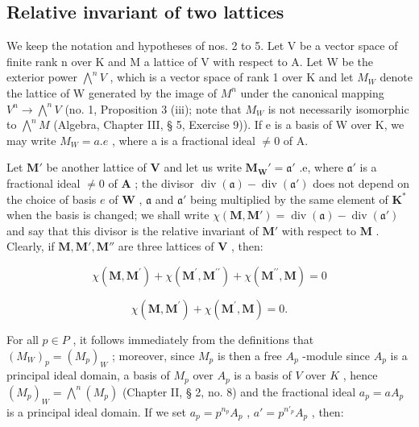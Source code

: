 \subsection{Relative invariant of two lattices}

We keep the notation and hypotheses of nos. 2 to 5. Let V be a vector space of finite rank n over K and M a lattice of V with respect to A. Let W be the exterior power \(\bigwedge^{n}V\) , which is a vector space of rank 1 over K and let \(M_{W}\) denote the lattice of W generated by the image of \(M^{n}\) under the canonical mapping \(V^{n}\to\bigwedge^{n}V\) (no. 1, Proposition 3 (iii); note that \(M_{W}\) is not necessarily isomorphic to \(\bigwedge^{n}M\) (Algebra, Chapter III, § 5, Exercise 9)). If e is a basis of W over K, we may write \(M_{W}=a.e\) , where a is a fractional ideal \(\neq0\) of A.

Let \(\mathbf{M}'\) be another lattice of \(\mathbf{V}\) and let us write \(\mathbf{M}_{\mathbf{W}}' = \mathfrak{a}'\) .e, where \(\mathfrak{a}'\) is a fractional ideal \(\neq 0\) of \(\mathbf{A}\) ; the divisor \(\operatorname{div}(\mathfrak{a}) - \operatorname{div}(\mathfrak{a}')\) does not depend on the choice of basis \(e\) of \(\mathbf{W}\) , \(\mathfrak{a}\) and \(\mathfrak{a}'\) being multiplied by the same element of \(\mathbf{K}^*\) when the basis is changed; we shall write \(\chi(\mathbf{M}, \mathbf{M}') = \operatorname{div}(\mathfrak{a}) - \operatorname{div}(\mathfrak{a}')\) and say that this divisor is the relative invariant of \(\mathbf{M}'\) with respect to \(\mathbf{M}\) . Clearly, if \(\mathbf{M}, \mathbf{M}', \mathbf{M}''\) are three lattices of \(\mathbf{V}\) , then:

\[
\chi (\mathbf {M}, \mathbf {M} ^ {\prime}) + \chi (\mathbf {M} ^ {\prime}, \mathbf {M} ^ {\prime \prime}) + \chi (\mathbf {M} ^ {\prime \prime}, \mathbf {M}) = 0\tag{3}
\]

\[
\chi (\mathbf {M}, \mathbf {M} ^ {\prime}) + \chi (\mathbf {M} ^ {\prime}, \mathbf {M}) = 0\tag{4}.
\]

For all \(p \in P\) , it follows immediately from the definitions that \((M_{W})_p = (M_p)_{W}\) ; moreover, since \(M_p\) is then a free \(A_p\) -module since \(A_p\) is a principal ideal domain, a basis of \(M_p\) over \(A_p\) is a basis of \(V\) over \(K\) , hence \((M_p)_W = \bigwedge^n (M_p)\) (Chapter II, § 2, no. 8) and the fractional ideal \(a_p = aA_p\) is a principal ideal domain. If we set \(a_p = p^{n_p} A_p\) , \(a' = p^{n'_{p}} A_p\) , then:

